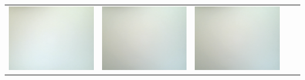\begin{tabular}{c c c c c}
\includegraphics[scale=0.11]{media/weissbilder/weissbild_0.png}
 & 
\includegraphics[scale=0.11]{media/weissbilder/weissbild_1.png}
 &
\includegraphics[scale=0.11]{media/weissbilder/weissbild_2.png}

\end{tabular}
